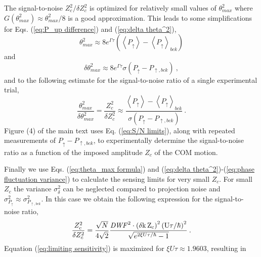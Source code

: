 \documentclass[aps,prl,onecolumn,superscriptaddress,floatfix]{revtex4-1}
\begin{document}
The signal-to-noise $Z_{c}^{2}/\delta Z_{c}^{2}$ is optimized
for relatively small values of $\theta_{max}^{2}$ where $G\left(\theta_{max}^{2}\right)\approx\theta_{max}^{2}/8$
is a good approximation. This leads to some simplifications for Eqs.
(\ref{eq:P_up difference}) and (\ref{eq:delta theta^2}),
\begin{equation}
\theta_{max}^{2}\approx8e^{\Gamma\tau}\left(\left\langle P_{\uparrow}\right\rangle -\left\langle P_{\uparrow}\right\rangle _{bck}\right)\label{eq:theta_max^sq}
\end{equation}
and
\begin{equation}
\delta\theta_{max}^{2}\approx8e^{\Gamma\tau}\sigma\left(P_{\uparrow} - P_{\uparrow,bck}\right)\:,\label{eq:delta theta_max^2}
\end{equation}
and to the following estimate for the signal-to-noise ratio of a single
experimental trial,
\begin{equation}
\frac{\theta_{max}^{2}}{\delta\theta_{max}^{2}} = \frac{Z_{c}^{2}}{\delta Z_{c}^{2}} \approx\frac{\left\langle P_{\uparrow}\right\rangle -\left\langle P_{\uparrow}\right\rangle _{bck}}{\sigma\left(P_{\uparrow} - P_{\uparrow,bck}\right)}\:.\label{eq:S/N limits}
\end{equation}
Figure (4) of the main text uses Eq. (\ref{eq:S/N limits}),
along with repeated measurements of $P_{\uparrow} - P_{\uparrow,bck}$,
to experimentally determine the signal-to-noise ratio as a function
of the imposed amplitude $Z_{c}$ of the COM motion.

Finally we use Eqs. (\ref{eq:theta_max formula}) and (\ref{eq:delta theta^2})-(\ref{eq:phase fluctuation variance})
to calculate the sensing limits for very small $Z_{c}$. For small
$Z_{c}$ the variance $\sigma_{\delta}^{2}$ can be neglected compared
to projection noise and $\sigma_{P_{\uparrow}}^2\approx\sigma_{P_{\uparrow, bck}}^2$.
In this case we obtain the following expression for the signal-to-noise
ratio,
\begin{equation}
\frac{Z_{c}^{2}}{\delta Z_{c}^{2}}=\frac{\sqrt{N}}{4\sqrt{2}}\frac{\rm{\it{DWF}}^{2}\cdot\left(\delta k\,Z_{c}\right)^{2}\left(U\tau/\hbar\right)^{2}}{\sqrt{e^{2\xi U\tau/\hbar}-1}}\:.\label{eq:limiting sensitivity}
\end{equation}
Equation (\ref{eq:limiting sensitivity}) is maximized for $\xi U\tau\approx1.9603$, resulting in 
\end{document}
